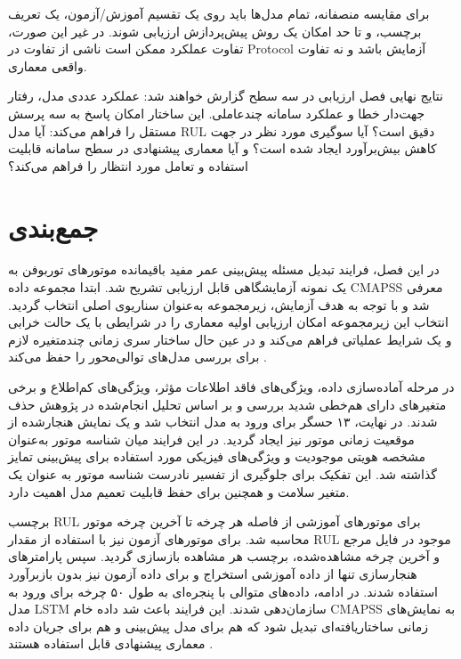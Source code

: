 برای مقایسه منصفانه، تمام مدل‌ها باید روی یک تقسیم آموزش/آزمون،
یک تعریف برچسب، و تا حد امکان یک روش پیش‌پردازش ارزیابی شوند.
در غیر این صورت، تفاوت عملکرد ممکن است ناشی از تفاوت در \gls{Protocol}
آزمایش باشد و نه تفاوت واقعی معماری.

نتایج نهایی فصل ارزیابی در سه سطح گزارش خواهند شد: عملکرد عددی
مدل، رفتار جهت‌دار خطا و عملکرد سامانه چندعاملی. این ساختار
امکان پاسخ به سه پرسش مستقل را فراهم می‌کند: آیا مدل \gls{RUL}
دقیق است؟ آیا سوگیری مورد نظر در جهت کاهش بیش‌برآورد ایجاد شده
است؟ و آیا معماری پیشنهادی در سطح سامانه قابلیت استفاده و تعامل
مورد انتظار را فراهم می‌کند؟






\section{جمع‌بندی}
\label{sec:chap3-summary}

در این فصل، فرایند تبدیل مسئله پیش‌بینی عمر مفید باقیمانده موتورهای
توربوفن به یک نمونه آزمایشگاهی قابل ارزیابی تشریح شد. ابتدا مجموعه
داده \gls{CMAPSS} معرفی شد و با توجه به هدف آزمایش، زیرمجموعه
 به‌عنوان سناریوی اصلی انتخاب گردید. انتخاب این
زیرمجموعه امکان ارزیابی اولیه معماری را در شرایطی با یک حالت
خرابی و یک شرایط عملیاتی فراهم می‌کند و در عین حال ساختار
سری زمانی چندمتغیره لازم برای بررسی مدل‌های توالی‌محور را حفظ
می‌کند \cite{NASA2007C-MAPSS}.

در مرحله آماده‌سازی داده، ویژگی‌های فاقد اطلاعات مؤثر، ویژگی‌های
کم‌اطلاع و برخی متغیرهای دارای هم‌خطی شدید بررسی و بر اساس تحلیل
انجام‌شده در پژوهش حذف شدند. در نهایت، ۱۳ حسگر برای ورود به مدل
انتخاب شد و یک نمایش هنجارشده از موقعیت زمانی موتور نیز ایجاد
گردید. در این فرایند میان شناسه موتور به‌عنوان مشخصه هویتی
موجودیت و ویژگی‌های فیزیکی مورد استفاده برای پیش‌بینی تمایز
گذاشته شد. این تفکیک برای جلوگیری از تفسیر نادرست شناسه موتور به
عنوان یک متغیر سلامت و همچنین برای حفظ قابلیت تعمیم مدل اهمیت
دارد.

برچسب \gls{RUL} برای موتورهای آموزشی از فاصله هر چرخه تا آخرین
چرخه موتور محاسبه شد. برای موتورهای آزمون نیز با استفاده از مقدار
\gls{RUL} موجود در فایل مرجع و آخرین چرخه مشاهده‌شده، برچسب هر
مشاهده بازسازی گردید. سپس پارامترهای هنجارسازی تنها از داده
آموزشی استخراج و برای داده آزمون نیز بدون بازبرآورد استفاده
شدند. در ادامه، داده‌های متوالی با پنجره‌ای به طول ۵۰ چرخه برای
ورود به مدل \gls{LSTM} سازمان‌دهی شدند. این فرایند باعث شد داده
خام \gls{CMAPSS} به نمایش‌های زمانی ساختاریافته‌ای تبدیل شود که هم
برای مدل پیش‌بینی و هم برای جریان داده معماری پیشنهادی قابل
استفاده هستند \cite{heimes2008recurrent}.


